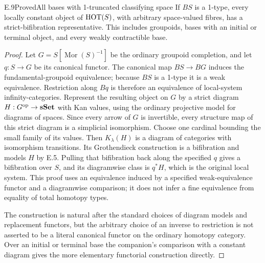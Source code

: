 \begin{statement}{E.9}{Proved}{All bases with 1-truncated classifying space}
If $BS$ is a 1-type, every locally constant object of $\mathrm{HOT}(S)$, with arbitrary space-valued fibres, has a strict-bifibration representative. This includes groupoids, bases with an initial or terminal object, and every weakly contractible base.
\end{statement}
\begin{proof}
Let $G=S[\operatorname{Mor}(S)^{-1}]$ be the ordinary groupoid completion, and let $q:S\to G$ be its canonical functor. The canonical map $BS\to BG$ induces the fundamental-groupoid equivalence; because $BS$ is a 1-type it is a weak equivalence. Restriction along $Bq$ is therefore an equivalence of local-system infinity-categories. Represent the resulting object on $G$ by a strict diagram $H:G^{\mathrm{op}}\to\mathbf{sSet}$ with Kan values, using the ordinary projective model for diagrams of spaces. Since every arrow of $G$ is invertible, every structure map of this strict diagram is a simplicial isomorphism. Choose one cardinal bounding the small family of its values. Then $K_\lambda(H)$ is a diagram of categories with isomorphism transitions. Its Grothendieck construction is a bifibration and models $H$ by E.5. Pulling that bifibration back along the specified $q$ gives a bifibration over $S$, and its diagramwise class is $q^*H$, which is the original local system. This proof uses an equivalence induced by a specified weak-equivalence functor and a diagramwise comparison; it does not infer a fine equivalence from equality of total homotopy types.

The construction is natural after the standard choices of diagram models and replacement functors, but the arbitrary choice of an inverse to restriction is not asserted to be a literal canonical functor on the ordinary homotopy category. Over an initial or terminal base the companion's comparison with a constant diagram gives the more elementary functorial construction directly.
\end{proof}

